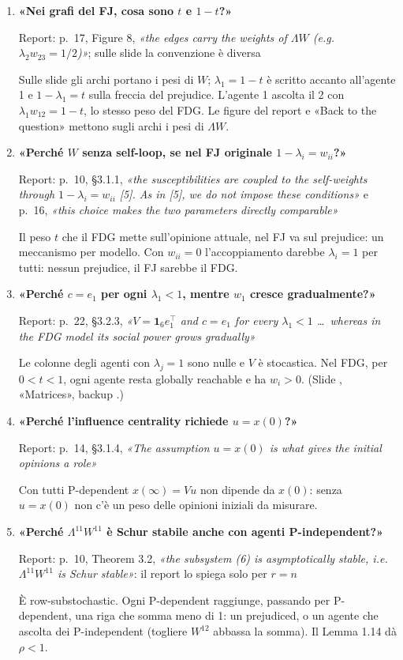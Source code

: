 \documentclass[a4paper,10pt]{article}
\newcommand{\fr}[1]{\getrefnumber{P-#1}}      %
\newcommand{\D}[3]{\item \textbf{«#1»}\par{\small\color{gray}Report: #2}\par #3}
\newcommand{\R}[2]{#1, \textit{«#2»}}
\begin{document}
\begin{enumerate}[resume*=fj]
  {\R{p.~22, §3.2.3}{On the directed cycle $c_2$ first goes below $w_2$ (its computed minimum is about $0.137$, at $\alpha \approx 0.65$)}: il report non lo spiega}
  {Solo a voce. $V_\alpha=(1-\alpha)\sum_k\alpha^kW^k$: per $\alpha$ intermedi pesano i cammini corti. Sul ciclo solo l'agente 1 ascolta il 2, con peso $\frac12$, e il peso di $x_2(0)$ cresce lentamente ($1,\ 0.5,\ 0.75,\dots\to6/7$); sull'anello il 2 è ascoltato da 1 e 3 e il calo non c'è. (Slide \fr{m-lemma}, «Numbers», backup \fr{bk-lemma-numbers}.)}
  \D{Nei grafi del FJ, cosa sono $t$ e $1-t$?}
  {\R{p.~17, Figure 8}{the edges carry the weights of $\Lambda W$ (e.g.\ $\lambda_2 w_{23} = 1/2$)}; sulle slide la convenzione è diversa}
  {Sulle slide gli archi portano i pesi di $W$; $\lambda_1=1-t$ è scritto accanto all'agente 1 e $1-\lambda_1=t$ sulla freccia del prejudice. L'agente 1 ascolta il 2 con $\lambda_1w_{12}=1-t$, lo stesso peso del FDG. Le figure del report e «Back to the question» mettono sugli archi i pesi di $\Lambda W$.}
  \D{Perché $W$ senza self-loop, se nel FJ originale $1-\lambda_i=w_{ii}$?}
  {\R{p.~10, §3.1.1}{the susceptibilities are coupled to the self-weights through $1-\lambda_i = w_{ii}$ [5]. As in [5], we do not impose these conditions} e \R{p.~16}{this choice makes the two parameters directly comparable}}
  {Il peso $t$ che il FDG mette sull'opinione attuale, nel FJ va sul prejudice: un meccanismo per modello. Con $w_{ii}=0$ l'accoppiamento darebbe $\lambda_i=1$ per tutti: nessun prejudice, il FJ sarebbe il FDG.}
  \D{Perché $c=e_1$ per ogni $\lambda_1<1$, mentre $w_1$ cresce gradualmente?}
  {\R{p.~22, §3.2.3}{$V = \mathbf 1_6 e_1^\top$ and $c = e_1$ for every $\lambda_1 < 1$ \dots\ whereas in the FDG model its social power grows gradually}}
  {Le colonne degli agenti con $\lambda_j=1$ sono nulle e $V$ è stocastica. Nel FDG, per $0<t<1$, ogni agente resta globally reachable e ha $w_i>0$. (Slide \fr{m-one-prej}, «Matrices», backup \fr{bk-one-prej}.)}
  \D{Perché l'influence centrality richiede $u=x(0)$?}
  {\R{p.~14, §3.1.4}{The assumption $u = x(0)$ is what gives the initial opinions a role}}
  {Con tutti P-dependent $x(\infty)=Vu$ non dipende da $x(0)$: senza $u=x(0)$ non c'è un peso delle opinioni iniziali da misurare.}
  \D{Perché $\Lambda^{11}W^{11}$ è Schur stabile anche con agenti P-independent?}
  {\R{p.~10, Theorem 3.2}{the subsystem (6) is asymptotically stable, i.e.\ $\Lambda^{11}W^{11}$ is Schur stable}: il report lo spiega solo per $r=n$}
  {È row-substochastic. Ogni P-dependent raggiunge, passando per P-dependent, una riga che somma meno di 1: un prejudiced, o un agente che ascolta dei P-independent (togliere $W^{12}$ abbassa la somma). Il Lemma 1.14 dà $\rho<1$.}

\end{enumerate}
\end{document}
